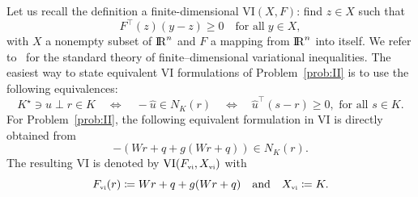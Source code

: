 {Let us recall the definition a finite-dimensional $\mathrm{VI}(X,F)$: find $z\in X$ such that 
\begin{equation}
  \label{eq:vi}
  F^\top(z)(y-z) \geq 0 \quad\text{for all}\; y \in X,
\end{equation}
with $X$ a nonempty subset of $\mathrm{I\!R}^n$ and $F$ a mapping from $\mathrm{I\!R}^n$ into itself. We refer to~\cite{Harker.Pang1990,Facchinei.Pang2003} for the standard  theory of finite--dimensional variational inequalities. The easiest way to state equivalent VI formulations of Problem~\ref{prob:II} is to use the following equivalences:
\begin{equation}
  \label{eq:SOCCP-1}
  K^\star \ni {\hat u} \perp r \in K \quad\Longleftrightarrow\quad
  - {\hat u} \in N_K(r) \quad \Longleftrightarrow\quad \hat u^\top (s -r) \geq 0, \text{ for all } s \in K.
\end{equation}
For Problem~\ref{prob:II}, the following equivalent formulation in VI is directly obtained from
\begin{equation}
  \label{eq:inclusion-1}
  -(W r + q + g(Wr+q))  \in N_K(r).
\end{equation}
 The resulting VI is denoted by $\mathrm{VI}(F_{{\hbox{\tiny{vi}}}},X_{{\hbox{\tiny{vi}}}})$ with
\begin{equation}
  \label{eq:vi-II}
  F_{\vitwo}(r) \coloneqq W r +q + g(Wr+q)\quad\text{and}\quad X_{\vitwo} \coloneqq K.
\end{equation}

}
